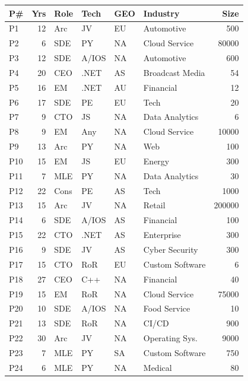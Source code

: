 \begin{figure}[t]
\begin{subfigure}[b]{0.46\textwidth}
    \centering
    \begin{tabular}{p{.4cm}r{.4cm}l{2.5cm}l{2cm}l{2cm}l{2.2cm}r{1.5cm}}%
\toprule
P\# & Yrs & Role & Tech & GEO & Industry & Size \\
    \midrule
P1 & 12 & Arc & JV & EU & Automotive & 500 &  \\ 
P2 & 6 & SDE & PY & NA & Cloud Service & 80000 &  \\ 
P3 & 12 & SDE & A/IOS & NA & Automotive & 600 &  \\ 
P4 & 20 & CEO & .NET & AS & Broadcast Media & 54 &  \\ 
P5 & 16 & EM & .NET & AU & Financial & 12 &  \\ 
P6 & 17 & SDE & PE & EU & Tech & 20 &  \\ 
P7 & 9 & CTO & JS & NA & Data Analytics & 6 &  \\ 
P8 & 9 & EM & Any & NA & Cloud Service & 10000 &  \\ 
P9 & 13 & Arc & PY & NA & Web & 100 &  \\ 
P10 & 15 & EM & JS & EU & Energy & 300 &  \\ 
P11 & 7 & MLE & PY & NA & Data Analytics & 30 &  \\ 
P12 & 22 & Cons & PE & AS & Tech & 1000 &  \\ 
P13 & 15 & Arc & JV & NA & Retail & 200000 &  \\ 
P14 & 6 & SDE & A/IOS & AS & Financial & 100 &  \\ 
P15 & 22 & CTO & .NET & AS & Enterprise & 300 &  \\ 
P16 & 9 & SDE & JV & AS & Cyber Security & 300 &  \\ 
P17 & 15 & CTO & RoR & EU & Custom Software & 6 &  \\ 
P18 & 27 & CEO & C++ & NA & Financial & 40 &  \\ 
P19 & 15 & EM & RoR & NA & Cloud Service & 75000 &  \\ 
P20 & 10 & SDE & A/IOS & NA & Food Service & 10 &  \\ 
P21 & 13 & SDE & RoR & NA & CI/CD & 900 &  \\ 
P22 & 30 & Arc & JV & NA & Operating Sys. & 9000 &  \\ 
P23 & 7 & MLE & PY & SA & Custom Software & 750 &  \\ 
P24 & 6 & MLE & PY & NA & Medical & 80 &  \\ 


\end{tabular}
\end{subfigure}
\end{figure}
